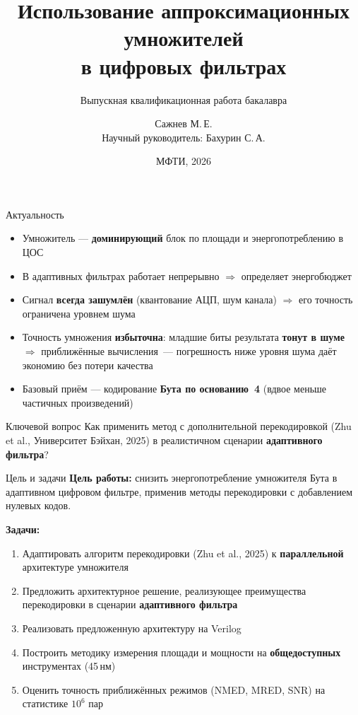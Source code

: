 \documentclass[aspectratio=169, 13pt]{beamer}
\title{Использование аппроксимационных умножителей\\в цифровых фильтрах}
\subtitle{Выпускная квалификационная работа бакалавра}
\author{Сажнев М.\,Е.\\[4pt]
  {\small Научный руководитель: Бахурин С.\,А.}}
\institute{Московский физико-технический институт}
\date{МФТИ, 2026}
\begin{document}

\begin{frame}[plain]
  \titlepage
\end{frame}

\begin{frame}{Актуальность}
  \begin{itemize}
    \item Умножитель — \textbf{доминирующий} блок по площади и энергопотреблению в ЦОС
    \item В адаптивных фильтрах работает непрерывно $\Rightarrow$ определяет энергобюджет
    \item Сигнал \textbf{всегда зашумлён} (квантование АЦП, шум канала)
          $\Rightarrow$ его точность ограничена уровнем шума
    \item Точность умножения \textbf{избыточна}: младшие биты результата
          \textbf{тонут в шуме} $\Rightarrow$ \alert{приближённые вычисления}~---
          погрешность ниже уровня шума даёт \alert{экономию без потери качества}
    \item Базовый приём — кодирование \textbf{Бута по основанию~4} (вдвое меньше частичных произведений)
  \end{itemize}

  \vfill
  \begin{block}{Ключевой вопрос}
    Как применить метод с дополнительной перекодировкой
    (Zhu et al., Университет Бэйхан, 2025)
    в реалистичном сценарии \textbf{адаптивного фильтра}?
  \end{block}
\end{frame}

\begin{frame}{Цель и задачи}
  \textbf{Цель работы:} снизить энергопотребление умножителя Бута
  в адаптивном цифровом фильтре, применив методы перекодировки
  с добавлением нулевых кодов.

  \vskip 12pt
  \textbf{Задачи:}
  \begin{enumerate}
    \item Адаптировать алгоритм перекодировки (Zhu et al., 2025)
          к \textbf{параллельной} архитектуре умножителя
    \item Предложить архитектурное решение, реализующее преимущества
          перекодировки в сценарии \textbf{адаптивного фильтра}
    \item Реализовать предложенную архитектуру на Verilog
    \item Построить методику измерения площади и мощности
          на \textbf{общедоступных} инструментах (45\,нм)
    \item Оценить точность приближённых режимов (NMED, MRED, SNR)
          на статистике $10^6$ пар
  \end{enumerate}
\end{frame}
\end{document}

